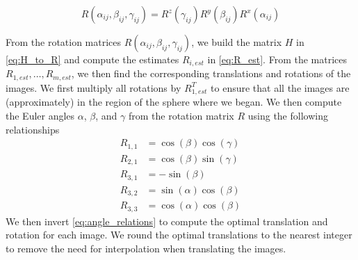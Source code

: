 \documentclass{pnastwo}
\begin{document}
\begin{article}
\begin{materials}
\begin{equation}
	R(\alpha_{ij}, \beta_{ij}, \gamma_{ij})	 = R^z(\gamma_{ij})  R^y(\beta_{ij})  R^x(\alpha_{ij})
\end{equation}
%

From the rotation matrices $R(\alpha_{ij}, \beta_{ij}, \gamma_{ij})$,
we build the matrix $H$ in \eqref{eq:H_to_R} and compute the estimates $R_{i, est}$ in \eqref{eq:R_est}.
%
From the matrices $R_{1, est}, \dots, R_{m, est}$, we then find the corresponding translations and rotations of the images.
%
We first multiply all rotations by $R_{1, est}^T$ to ensure that all the images are (approximately) in the region of the sphere where we began.
%
We then compute the Euler angles $\alpha$, $\beta$, and $\gamma$ from the rotation matrix $R$ using the following relationships
\begin{equation}
\begin{aligned}
R_{1,1} & = \cos(\beta)\cos(\gamma) \\
R_{2,1} & = \cos(\beta)\sin(\gamma) \\
R_{3,1} & = -\sin(\beta) \\
R_{3,2} & = \sin(\alpha)\cos(\beta) \\
R_{3,3} & = \cos(\alpha)\cos(\beta) 
\end{aligned}
\end{equation}
%
We then invert \eqref{eq:angle_relations} to compute the optimal translation and rotation for each image.
%
We round the optimal translations to the nearest integer to remove the need for interpolation when translating the images.  


\end{materials}
\end{article}
\end{document}
